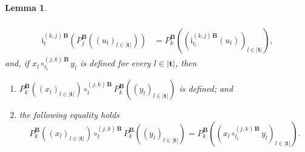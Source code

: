 \documentclass[a4paper, reqno]{amsbook}
\newcommand{\bb}[1]{\ensuremath{\lvert #1 \rvert}}
\theoremstyle{plain}
\newtheorem{lemma}[theorem]{Lemma}
\theoremstyle{definition}
\begin{document}
\begin{lemma}
\begin{enumerate}
\begin{align*}
\\
\mathrm{i}^{(k,j)\,\mathbf{B}}_{t}\left(P_{j}^{\mathbf{B}}\left((u_{l})_{l\in\bb{\mathbf{t}}}\right)\right)&=P_{k}^{\mathbf{B}}\left(\left(\mathrm{i}^{(k,j)\,\mathbf{B}}_{t_{l}}(u_{l})\right)_{l\in\bb{\mathbf{t}}}\right),
\end{align*}
and, if $x_{l}\circ^{(j,k)\,\mathbf{B}}_{t_{l}}y_{l}$ is defined for every $l\in\bb{\mathbf{t}}$, then
\begin{enumerate}
\item $P_{k}^{\mathbf{B}}((x_{l})_{l\in\bb{\mathbf{t}}})\circ^{(j,k)\,\mathbf{B}}_{t}P_{k}^{\mathbf{B}}((y_{l})_{l\in\bb{\mathbf{t}}})$ is defined; and
\item the following equality holds
$$
P_{k}^{\mathbf{B}}\left((x_{l})_{l\in\bb{\mathbf{t}}}\right)\circ^{(j,k)\,\mathbf{B}}_{t}P_{k}^{\mathbf{B}}\left((y_{l})_{l\in\bb{\mathbf{t}}}\right)=P_{k}^{\mathbf{B}}\left(\left(x_{l}\circ^{(j,k)\,\mathbf{B}}_{t_{l}}y_{l}\right)_{l\in\bb{\mathbf{t}}}\right).
$$
\end{enumerate}
\end{enumerate}
\end{lemma}
\end{document}
